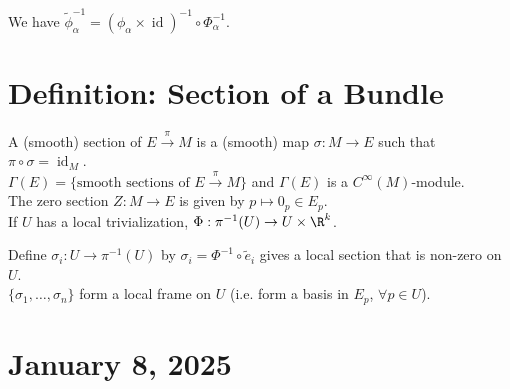 \documentclass[11pt]{article}
\begin{document}
We have \(\tilde{\phi}_{\alpha}^{-1}=(\phi_{\alpha}\times\operatorname{id})^{-1}\circ\Phi_{\alpha}^{-1}\).\\

\section*{Definition: Section of a Bundle}
\label{sec:org932ec0f}
A (smooth) section of \(E\overset{\pi}{\to}M\) is a (smooth) map \(\sigma:M\to E\) such that \(\pi\circ\sigma=\operatorname{id}_{M}\).\\
\(\Gamma(E)=\{\text{smooth sections of }E\overset{\pi}{\to}M\}\) and \(\Gamma(E)\) is a \(C^{\infty}(M)\)-module.\\
The zero section \(Z:M\to E\) is given by \(p\mapsto 0_{p}\in E_{p}\).\\
If \(U\) has a local trivialization, \(\Phi:\pi^{-1}(U)\to U\times\R^{k}\).\\


Define \(\sigma_{i}:U\to\pi^{-1}(U)\) by \(\sigma_{i}=\Phi^{-1}\circ\tilde{e}_{i}\) gives a local section that is non-zero on \(U\).\\
\(\{\sigma_{1},\ldots,\sigma_{n}\}\) form a local frame on \(U\) (i.e. form a basis in \(E_{p}\), \(\forall p\in U\)).\\
\section*{January 8, 2025}
\label{sec:org0c30c5e}
\end{document}
